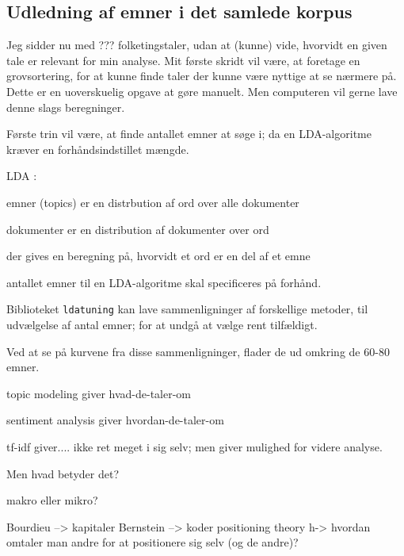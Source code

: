 \subsection{Udledning af emner i det samlede korpus}

Jeg sidder nu med ??? folketingstaler, udan at (kunne) vide, hvorvidt en given tale er relevant for min analyse.
Mit første skridt vil være, at foretage en grovsortering, for at kunne finde taler der kunne være nyttige at se nærmere på.
Dette er en uoverskuelig opgave at gøre manuelt.
Men computeren vil gerne lave denne slags beregninger.

Første trin vil være, at finde antallet emner at søge i; da en LDA-algoritme kræver en forhåndsindstillet mængde.

LDA \autocite{grunTopicmodelsPackageFitting2011}: 

emner (topics) er en distrbution af ord over alle dokumenter

dokumenter er en distribution af dokumenter over ord

der gives en beregning på, hvorvidt et ord er en del af et emne

antallet emner til en LDA-algoritme skal specificeres på forhånd.

Biblioteket \texttt{ldatuning} kan lave sammenligninger af forskellige metoder, til udvælgelse af antal emner; for at undgå at vælge rent tilfældigt.

\begin{figure}
\centering

\end{figure}

Ved at se på kurvene fra disse sammenligninger, flader de ud omkring de 60-80 emner.

topic modeling giver hvad-de-taler-om

sentiment analysis giver hvordan-de-taler-om

tf-idf giver.... ikke ret meget i sig selv; men giver mulighed for videre analyse.

Men hvad betyder det?

makro eller mikro?

Bourdieu --> kapitaler
Bernstein --> koder
positioning theory h-> hvordan omtaler man andre for at positionere sig selv (og de andre)?
